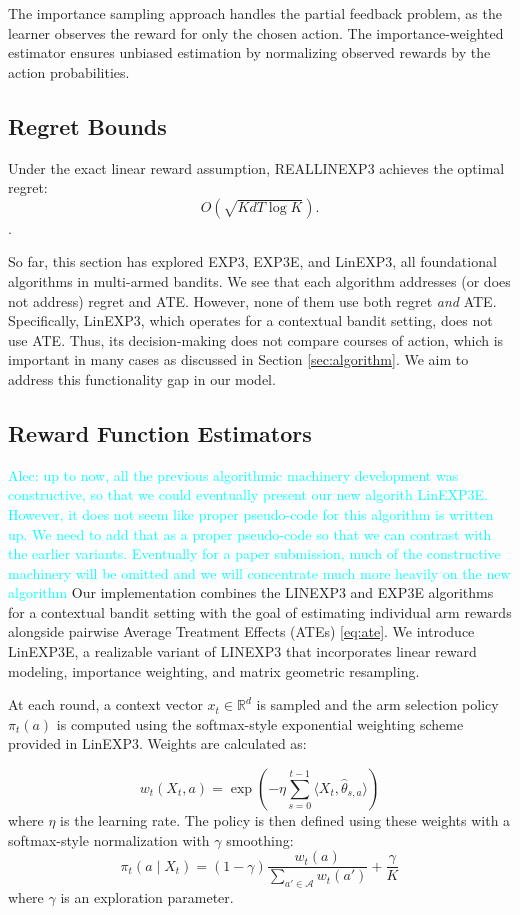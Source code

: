 The importance sampling approach handles the partial feedback problem, as the learner observes the reward for only the chosen action. The importance-weighted estimator ensures unbiased estimation by normalizing observed rewards by the action probabilities.

\subsection{Regret Bounds}
Under the exact linear reward assumption, REALLINEXP3 achieves the optimal regret:
\[
O\left(\sqrt{KdT \log K}\right).
\]
\citep{neu2020linear}.

So far, this section has explored EXP3, EXP3E, and LinEXP3, all foundational algorithms in multi-armed bandits. We see that each algorithm addresses (or does not address) regret and ATE. However, none of them use both regret \textit{and} ATE. Specifically, LinEXP3, which operates for a contextual bandit setting, does not use ATE. Thus, its decision-making does not compare courses of action, which is important in many cases as discussed in Section \ref{sec:algorithm}. We aim to address this functionality gap in our model.


\subsection{Reward Function Estimators}
\textcolor{cyan}{Alec: up to now, all the previous algorithmic machinery development was constructive, so that we could eventually present our new algorith LinEXP3E. However, it does not seem like proper pseudo-code for this algorithm is written up. We need to add that as a proper pseudo-code so that we can contrast with the earlier variants. Eventually for a paper submission, much of the constructive machinery will be omitted and we will concentrate much more heavily on the new algorithm}
Our implementation combines the LINEXP3 and EXP3E algorithms for a contextual bandit setting with the goal of estimating individual arm rewards alongside pairwise Average Treatment Effects (ATEs) \ref{eq:ate}. We introduce LinEXP3E, a realizable variant of LINEXP3 that incorporates linear reward modeling, importance weighting, and matrix geometric resampling.

At each round, a context vector $x_t \in \mathbb{R}^d$ is sampled and the arm selection policy $\pi_t(a)$ is computed using the softmax-style exponential weighting scheme provided in LinEXP3. Weights are calculated as:

\[w_t(X_t,a) = \exp\left(-\eta \sum_{s=0}^{t-1} \langle X_t, \hat{\theta}_{s, a} \rangle \right) \] where $\eta$ is the learning rate. The policy is then defined using these weights with a softmax-style normalization with $\gamma$ smoothing:
    \[
  \pi_t(a \mid X_t) = (1 - \gamma) \frac{w_t(a)}{\sum_{a' \in \mathcal{A}} w_t(a')} + \frac{\gamma}{K} 
    \]
    where $\gamma$ is an exploration parameter.
    
